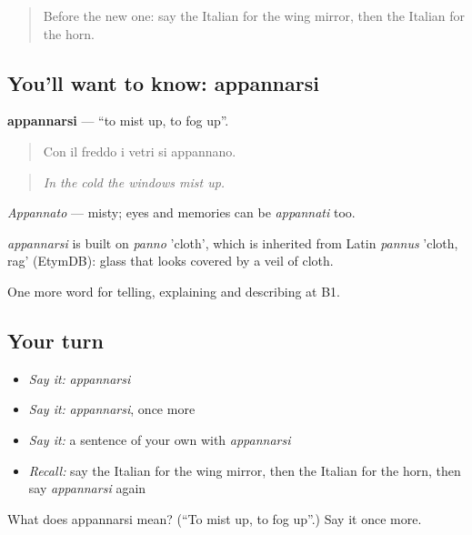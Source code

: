 \label{lesson:IT-C407-appannarsi}



\begin{quote}
Before the new one: say the Italian for the wing mirror, then the Italian for the horn.
\end{quote}

\subsection*{You'll want to know: appannarsi}
\textbf{appannarsi} — \textquotedblleft{}to mist up, to fog up\textquotedblright{}.

\begin{quote}
Con il freddo i vetri si appannano.
\end{quote}

\begin{quote}
\emph{In the cold the windows mist up.}
\end{quote}

\emph{Appannato} — misty; eyes and memories can be \emph{appannati} too.

\begin{cousinweb}
\emph{appannarsi} is built on \emph{panno} 'cloth', which is inherited from Latin \emph{pannus} 'cloth, rag' (EtymDB): glass that looks covered by a veil of cloth.
\end{cousinweb}

\begin{grammarlens}[title={What you've built}]
One more word for telling, explaining and describing at B1.
\end{grammarlens}

\subsection*{Your turn}
\begin{itemize}
\raggedright
  \item \emph{Say it:} \emph{appannarsi}
  \item \emph{Say it:} \emph{appannarsi}, once more
  \item \emph{Say it:} a sentence of your own with \emph{appannarsi}
  \item \emph{Recall:} say the Italian for the wing mirror, then the Italian for the horn, then say \emph{appannarsi} again
\end{itemize}

\begin{tcolorbox}[breakable,colback=teal!4,colframe=teal!35!black,title={Before you move on}]
What does appannarsi mean? (\textquotedblleft{}To mist up, to fog up\textquotedblright{}.) Say it once more.
\end{tcolorbox}
